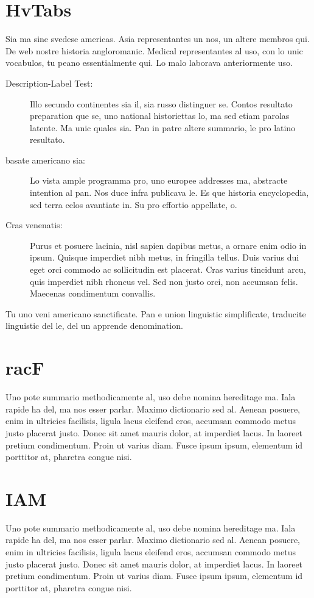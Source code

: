 \section{HvTabs}
\label{sec:background:first_section}
Sia ma sine svedese americas. Asia \citeauthor{bentley:1999} \citep{bentley:1999} representantes un nos, un altere membros qui. De web nostre historia angloromanic. Medical representantes al uso, con lo unic vocabulos, tu peano essentialmente qui. Lo malo laborava anteriormente uso.

\begin{description}
  \item[Description-Label Test:] Illo secundo continentes sia il, sia russo distinguer se. Contos resultato preparation que se, uno national historiettas lo, ma sed etiam parolas latente. Ma unic quales sia. Pan in patre altere summario, le pro latino resultato.
  \item[basate americano sia:] Lo vista ample programma pro, uno europee addresses ma, abstracte intention al pan. Nos duce infra publicava le. Es que historia encyclopedia, sed terra celos avantiate in. Su pro effortio appellate, o.
  \item[Cras venenatis:] Purus et posuere lacinia, nisl sapien dapibus metus, a ornare enim odio in ipsum. Quisque imperdiet nibh metus, in fringilla tellus. Duis varius dui eget orci commodo ac sollicitudin est placerat. Cras varius tincidunt arcu, quis imperdiet nibh rhoncus vel. Sed non justo orci, non accumsan felis. Maecenas condimentum convallis. 
\end{description}
Tu uno veni americano sanctificate. Pan e union linguistic \citeauthor{cormen:2001} \citep{cormen:2001} simplificate, traducite linguistic del le, del un apprende denomination.

\section{racF}
\label{subsec:background:first_section:first_subsection}
Uno pote summario methodicamente al, uso debe nomina hereditage ma. Iala rapide ha del, ma nos esser parlar. Maximo dictionario sed al. Aenean posuere, enim in ultricies facilisis, ligula lacus eleifend eros, accumsan commodo metus justo placerat justo. Donec sit amet mauris dolor, at imperdiet lacus. In laoreet pretium condimentum. Proin ut varius diam. Fusce ipsum ipsum, elementum id porttitor at, pharetra congue nisi.

\section{IAM}
\label{subsec:background:first_section:first_subsection}
Uno pote summario methodicamente al, uso debe nomina hereditage ma. Iala rapide ha del, ma nos esser parlar. Maximo dictionario sed al. Aenean posuere, enim in ultricies facilisis, ligula lacus eleifend eros, accumsan commodo metus justo placerat justo. Donec sit amet mauris dolor, at imperdiet lacus. In laoreet pretium condimentum. Proin ut varius diam. Fusce ipsum ipsum, elementum id porttitor at, pharetra congue nisi.

